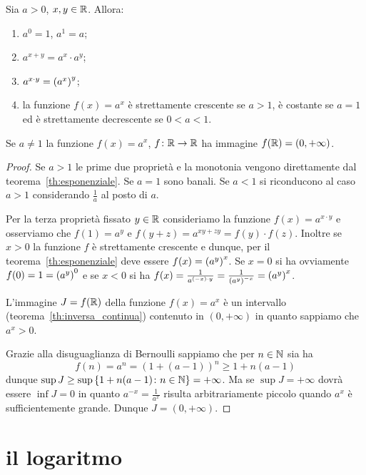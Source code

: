 \begin{theorem}
\label{th:proprieta_potenze_reali}%
%
%
%
%
Sia $a>0$, $x,y\in \mathbb R$. Allora:
\begin{enumerate}
 \item $a^0=1$, $a^1=a$;
 \item $a^{x+y} = a^x\cdot a^y$;
 \item $a^{x\cdot y} = {\left( a^x \right)}^y$;
 \item la funzione $f(x)=a^x$
 è strettamente crescente se $a>1$,
 è costante se $a=1$ ed è strettamente
 decrescente se $0<a<1$.
\end{enumerate}

Se $a\neq 1$ la funzione $f(x)=a^x$, $f\colon \mathbb R \to \mathbb R$
ha immagine $f(\mathbb R)=(0,+\infty)$.
\end{theorem}
%
\begin{proof}
Se $a>1$ le prime due proprietà e la monotonia
vengono direttamente
dal teorema~\ref{th:esponenziale}.
Se $a=1$ sono banali. Se $a<1$ si riconducono al caso
$a>1$ considerando $\frac{1}{a}$ al posto di $a$.

Per la terza proprietà fissato $y\in\mathbb R$
consideriamo la funzione $f(x) = a^{x\cdot y}$
e osserviamo che $f(1)=a^y$ e $f(y+z)=a^{xy + zy}
=f(y)\cdot f(z)$.
Inoltre se $x>0$ la funzione $f$ è strettamente
crescente e dunque, per il teorema~\ref{th:esponenziale}
deve essere $f(x) = {\left( a^y \right)}^x$. Se $x=0$
si ha ovviamente $f(0) = 1 = {\left( a^y \right)}^0$
e se $x<0$ si ha $f(x) = \frac{1}{a^{(-x)\cdot y}}
= \frac{1}{{\left( a^y \right)}^{-x}} = {\left( a^y \right)}^x$.

L'immagine $J=f(\mathbb R)$ della funzione $f(x) = a^x$
è un intervallo (teorema~\ref{th:inversa_continua})
contenuto in $(0,+\infty)$ in quanto sappiamo che $a^x>0$.

Grazie alla disuguaglianza di Bernoulli sappiamo che
per $n\in \mathbb N$ sia ha
\[
f(n) = a^n = (1+(a-1))^n \ge 1 + n(a-1)
\]
dunque $\sup J \ge \sup {\left\{ 1+n(a-1)\colon n\in \mathbb N\right\}} = +\infty$.
Ma se $\sup J = +\infty$ dovrà essere $\inf J = 0$
in quanto $a^{-x} = \frac{1}{a^x}$ risulta arbitrariamente piccolo
quando $a^x$ è sufficientemente grande. Dunque $J=(0,+\infty)$.
\end{proof}

\section{il logaritmo}

